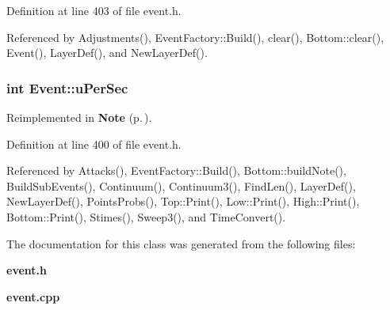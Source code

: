 Definition at line 403 of file event.h.

Referenced by Adjustments(), Event\-Factory::Build(), clear(), Bottom::clear(), Event(), Layer\-Def(), and New\-Layer\-Def().
\subsubsection{\setlength{\rightskip}{0pt plus 5cm}int {\bf Event::u\-Per\-Sec}}\label{classEvent_o15}




Reimplemented in {\bf Note} {\rm (p.\,\pageref{classNote_r5})}.

Definition at line 400 of file event.h.

Referenced by Attacks(), Event\-Factory::Build(), Bottom::build\-Note(), Build\-Sub\-Events(), Continuum(), Continuum3(), Find\-Len(), Layer\-Def(), New\-Layer\-Def(), Points\-Probs(), Top::Print(), Low::Print(), High::Print(), Bottom::Print(), Stimes(), Sweep3(), and Time\-Convert().

The documentation for this class was generated from the following files:\begin{CompactItemize}
\item 
{\bf event.h}\item 
{\bf event.cpp}\end{CompactItemize}

